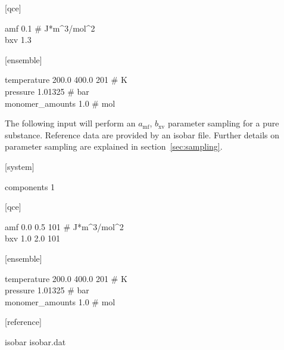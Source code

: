 \documentclass{scrartcl}
\newcommand{\amf}{a_\mathrm{mf}}
\newcommand{\bxv}{b_\mathrm{xv}}
\begin{document}
\begin{addmargin}[1cm]{0cm}
    \ttfamily
    \begin{minipage}{\textwidth}
        [qce]
        \begin{addmargin}[1cm]{0cm}
            amf 0.1 \# J*m\^{}3/mol\^{}2 \\
            bxv 1.3
        \end{addmargin}
    \end{minipage}

    \begin{minipage}{\textwidth}
        [ensemble]
        \begin{addmargin}[1cm]{0cm}
            temperature 200.0 400.0 201 \# K \\
            pressure 1.01325 \# bar \\
            monomer\_amounts 1.0 \# mol
        \end{addmargin}
    \end{minipage}
\end{addmargin}

The following input will perform an $\amf$, $\bxv$ parameter sampling for a pure substance.
Reference data are provided by an isobar file.
Further details on parameter sampling are explained in section~\vref{sec:sampling}.

\begin{addmargin}[1cm]{0cm}
    \ttfamily
    \begin{minipage}{\textwidth}
        [system]
        \begin{addmargin}[1cm]{0cm}
            components 1
        \end{addmargin}
    \end{minipage}

    \begin{minipage}{\textwidth}
        [qce]
        \begin{addmargin}[1cm]{0cm}
            amf 0.0 0.5 101 \# J*m\^{}3/mol\^{}2 \\
            bxv 1.0 2.0 101
        \end{addmargin}
    \end{minipage}

    \begin{minipage}{\textwidth}
        [ensemble]
        \begin{addmargin}[1cm]{0cm}
            temperature 200.0 400.0 201 \# K \\
            pressure 1.01325 \# bar \\
            monomer\_amounts 1.0 \# mol
        \end{addmargin}
    \end{minipage}

    \begin{minipage}{\textwidth}
        [reference]
        \begin{addmargin}[1cm]{0cm}
            isobar isobar.dat
        \end{addmargin}
    \end{minipage}
\end{addmargin}
\end{document}

